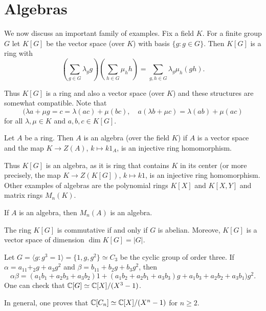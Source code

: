 \chapter{Algebras}

We now discuss an important family of examples. 
Fix a field $K$. 
For a finite group $G$ let $K[G]$ be the vector space (over $K$)
with basis $\{g:g\in G\}$. Then $K[G]$ is a ring
with
\[
\left(\sum_{g\in G}\lambda_gg\right)\left(\sum_{h\in G}\mu_hh\right)
=\sum_{g,h\in G}\lambda_g\mu_h(gh).
\] 

Thus $K[G]$ is a ring and also a vector space (over $K$) and these structures
are somewhat compatible. Note that
\[
(\lambda a+\mu g=c=\lambda (ac)+\mu (bc),\quad
a(\lambda b+\mu c)=\lambda (ab)+\mu (ac)
\]
for all $\lambda,\mu\in K$ and $a,b,c\in K[G]$. 

\begin{definition}
Let $A$ be a ring. Then $A$ is an algebra (over the field $K$) if $A$ is a vector space
and the map $K\to Z(A)$, $k\mapsto k1_A$, is an injective ring homomorphism.  
\end{definition}

Thus $K[G]$ is an algebra, as it is ring that contains $K$ in its center (or more precisely,
the map $K\to Z(K[G])$, $k\mapsto k1$, is an injective ring homomorphism.  
Other examples of algebras 
are the polynomial rings $K[X]$ and $K[X,Y]$ and matrix rings $M_n(K)$.  

\begin{example}
	If $A$ is an algebra, then $M_n(A)$ is an algebra.	
\end{example}

The ring $K[G]$ is commutative if and only if $G$ is abelian. Moreove,
$K[G]$ is a vector space of dimension $\dim K[G]=|G|$.

\begin{example}
	Let $G=\langle g:g^3=1\rangle=\{1,g,g^2\}\simeq C_3$ be the cyclic group of order three. 
	If $\alpha=a_11+_2g+a_3g^2$ and $\beta=b_11+b_2g+b_3g^2$, then
	\[
		\alpha\beta=(a_1b_1+a_2b_3+a_3b_2)1+(a_1b_2+a_2b_1+a_3b_3)g+a_1b_3+a_2b_2+a_3b_1)g^2.
	\]
	One can check that $\mathbb{C}[G]\simeq\mathbb{C}[X]/(X^3-1)$. 
\end{example}

In general, one proves that $\mathbb{C}[C_n]\simeq\mathbb{C}[X]/(X^n-1)$ for $n\geq2$.

